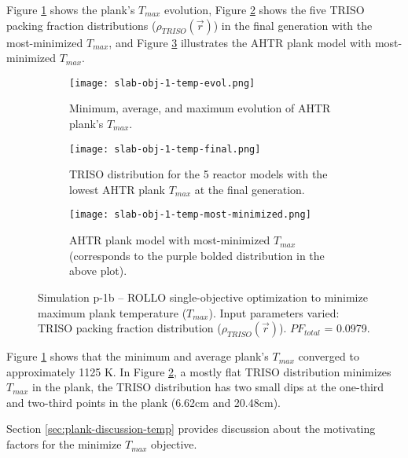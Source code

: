 Figure \ref{fig:slab-obj-1-temp-evol} shows the plank's $T_{max}$ evolution, Figure 
\ref{fig:slab-obj-1-temp-final} shows the five \gls{TRISO} packing fraction
distributions ($\rho_{TRISO}(\vec{r})$) in the final generation with the 
most-minimized $T_{max}$, and 
Figure \ref{fig:slab-obj-1-temp-most-minimized} illustrates the \gls{AHTR} plank model 
with most-minimized $T_{max}$. 
\begin{figure}[htbp!]
    \centering
    \begin{subfigure}{0.9\textwidth}
        \texttt{[image: slab-obj-1-temp-evol.png]}
        \caption{Minimum, average, and maximum evolution of AHTR plank's $T_{max}$.}
        \label{fig:slab-obj-1-temp-evol} 
    \end{subfigure}
    \begin{subfigure}{0.9\textwidth}
        \texttt{[image: slab-obj-1-temp-final.png]}
        \caption{TRISO distribution for the 5 reactor models with the 
        lowest AHTR plank $T_{max}$ at the final generation.}
        \label{fig:slab-obj-1-temp-final} 
    \end{subfigure}
    \begin{subfigure}{0.9\textwidth}
        \texttt{[image: slab-obj-1-temp-most-minimized.png]}
        \caption{\gls{AHTR} plank model with most-minimized $T_{max}$
        (corresponds to the purple bolded distribution in the above plot).}
        \label{fig:slab-obj-1-temp-most-minimized} 
    \end{subfigure}
    \caption{Simulation p-1b -- ROLLO single-objective optimization to minimize 
    maximum plank temperature ($T_{max}$). Input parameters varied: TRISO 
    packing fraction distribution ($\rho_{TRISO}(\vec{r})$). $PF_{total}$ = 0.0979.}
    \label{fig:slab-obj-1-temp}
\end{figure}

Figure \ref{fig:slab-obj-1-temp-evol} shows that the minimum and average plank's 
$T_{max}$ converged to approximately 1125 K. 
In Figure \ref{fig:slab-obj-1-temp-final}, a mostly flat TRISO
distribution minimizes $T_{max}$ in the plank, the TRISO distribution 
has two small dips at the one-third and two-third points in the plank 
(6.62cm and 20.48cm). 

Section \ref{sec:plank-discussion-temp} provides discussion about the motivating factors 
for the minimize $T_{max}$ objective. 

